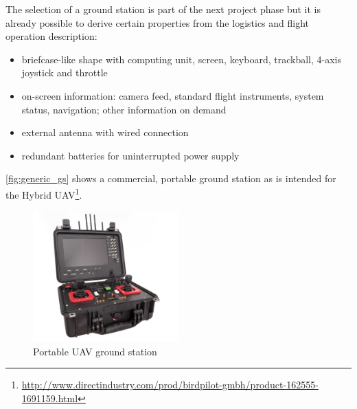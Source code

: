The selection of a ground station is part of the next project phase but it is already possible to derive certain properties from the logistics and flight operation description:

\begin{itemize}
    \item briefcase-like shape with computing unit, screen, keyboard, trackball, 4-axis joystick and throttle
    \item on-screen information: camera feed, standard flight instruments, system status, navigation; other information on demand
    \item external antenna with wired connection
    \item redundant batteries for uninterrupted power supply
\end{itemize}

\autoref{fig:generic_gs} shows a commercial, portable ground station as is intended for the Hybrid UAV\footnote{\url{http://www.directindustry.com/prod/birdpilot-gmbh/product-162555-1691159.html}}.

\begin{figure}[htb]
    \centering
    \includegraphics[width=0.5\textwidth]{Operations/Figures/ground.jpg}
    \caption{Portable UAV ground station}
    \label{fig:generic_gs}
\end{figure}